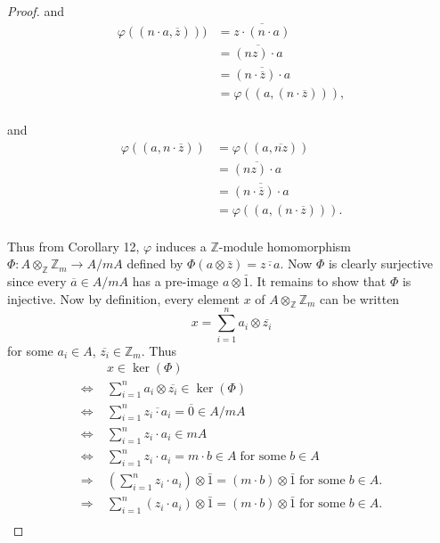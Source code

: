 \documentclass{article}
\begin{document}
\begin{enumerate}[label={(\alph*)}]
\begin{proof}
        and
        \begin{align*}
          \varphi((n\cdot a,\overline{z})))
          &=\overline{z\cdot (n\cdot a)}\\
          &=\overline{(nz)\cdot a}\\
          &=\overline{(n\cdot\overline{z})\cdot a}\\
          &=\varphi((a, (n\cdot \overline{z}))),\\
        \end{align*}

        and
        \begin{align*}
          \varphi((a,n\cdot\overline{z}))
          &=\varphi((a,\overline{nz}))\\
          &=\overline{(nz)\cdot a}\\
          &=\overline{(n\cdot\overline{z})\cdot a}\\
          &=\varphi((a, (n\cdot \overline{z}))).\\
        \end{align*}

        Thus from Corollary 12, $\varphi$ induces a $\mathbb{Z}$-module
        homomorphism $\Phi:A\otimes_\mathbb{Z}\mathbb{Z}_m \rightarrow
        A/mA$ defined by $\Phi(a\otimes\bar{z})=\overline{z\cdot a}$. Now
        $\Phi$ is clearly surjective since every $\overline{a}\in
        A/mA$ has a pre-image $a\otimes\bar{1}$. It remains to show that
        $\Phi$ is injective. Now by definition, every element $x$ of
        $A\otimes_\mathbb{Z}\mathbb{Z}_m$ can be written
        \[x=\sum_{i=1}^n a_i\otimes\overline{z_i}\]
        for some $a_i\in A$, $\overline{z_i}\in\mathbb{Z}_m$. Thus
        \begin{align*}
          \;&x\in\ker(\Phi)\\
          \Leftrightarrow\;&\sum_{i=1}^n a_i\otimes\overline{z_i}
            \in\ker(\Phi)\\
          \Leftrightarrow\;&\sum_{i=1}^n \overline{z_i\cdot
            a_i}=\overline{0}\in A/mA\\
          \Leftrightarrow\;&\sum_{i=1}^n z_i\cdot a_i\in mA\\
          \Leftrightarrow\;&\sum_{i=1}^n z_i\cdot a_i =m\cdot b\in A\;
            \text{for some}\; b\in A\\
          \Rightarrow\;&\left(\sum_{i=1}^n z_i\cdot a_i\right)
            \otimes\bar{1}=(m\cdot b)\otimes\bar{1}\; \text{for some}\;
            b\in A.\\
          \Rightarrow\;&\sum_{i=1}^n (z_i\cdot a_i)\otimes\bar{1} =(m\cdot
            b)\otimes\bar{1}\; \text{for some}\; b\in A.\\
        \end{align*}


\end{proof}
\end{enumerate}
\end{document}
